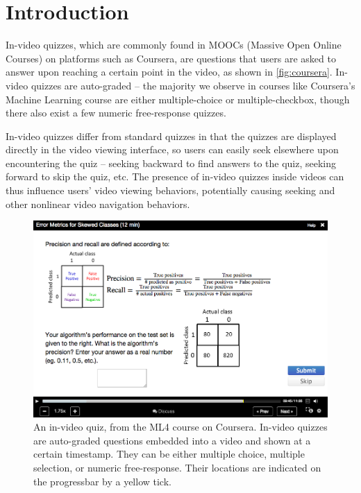\documentclass{sigchi}
\begin{document}


\section{Introduction}

In-video quizzes, which are commonly found in MOOCs (Massive Open Online Courses) on platforms such as Coursera, are questions that users are asked to answer upon reaching a certain point in the video, as shown in \autoref{fig:coursera}. In-video quizzes are auto-graded -- the majority we observe in courses like Coursera's Machine Learning course are either multiple-choice or multiple-checkbox, though there also exist a few numeric free-response quizzes.

In-video quizzes differ from standard quizzes in that the quizzes are displayed directly in the video viewing interface, so users can easily seek elsewhere upon encountering the quiz -- seeking backward to find answers to the quiz, seeking forward to skip the quiz, etc.
The presence of in-video quizzes inside videos can thus influence users' video viewing behaviors, potentially causing seeking and other nonlinear video navigation behaviors. %

\begin{figure}
\includegraphics[width=1.0\columnwidth]{coursera}
\caption{An in-video quiz, from the ML4 course on Coursera. In-video quizzes are auto-graded questions embedded into a video and shown at a certain timestamp. They can be either multiple choice, multiple selection, or numeric free-response. Their locations are indicated on the progressbar by a yellow tick.}
\label{fig:coursera}
\end{figure}
\end{document}
